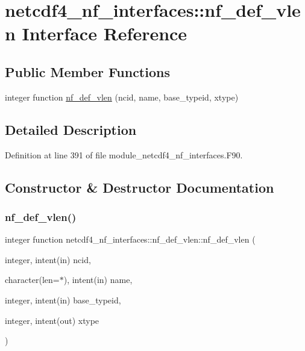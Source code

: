 \hypertarget{interfacenetcdf4__nf__interfaces_1_1nf__def__vlen}{}\section{netcdf4\+\_\+nf\+\_\+interfaces\+:\+:nf\+\_\+def\+\_\+vlen Interface Reference}
\label{interfacenetcdf4__nf__interfaces_1_1nf__def__vlen}
\subsection*{Public Member Functions}
\begin{DoxyCompactItemize}
\item 
integer function \hyperlink{interfacenetcdf4__nf__interfaces_1_1nf__def__vlen_ac1355cbf10e085cf7202f8f03790eed7}{nf\+\_\+def\+\_\+vlen} (ncid, name, base\+\_\+typeid, xtype)
\end{DoxyCompactItemize}


\subsection{Detailed Description}


Definition at line 391 of file module\+\_\+netcdf4\+\_\+nf\+\_\+interfaces.\+F90.



\subsection{Constructor \& Destructor Documentation}
\mbox{\label{interfacenetcdf4__nf__interfaces_1_1nf__def__vlen_ac1355cbf10e085cf7202f8f03790eed7}} 
\subsubsection{\texorpdfstring{nf\+\_\+def\+\_\+vlen()}{nf\_def\_vlen()}}
{\footnotesize\ttfamily integer function netcdf4\+\_\+nf\+\_\+interfaces\+::nf\+\_\+def\+\_\+vlen\+::nf\+\_\+def\+\_\+vlen (\begin{DoxyParamCaption}\item[{integer, intent(in)}]{ncid,  }\item[{character(len=$\ast$), intent(in)}]{name,  }\item[{integer, intent(in)}]{base\+\_\+typeid,  }\item[{integer, intent(out)}]{xtype }\end{DoxyParamCaption})}



